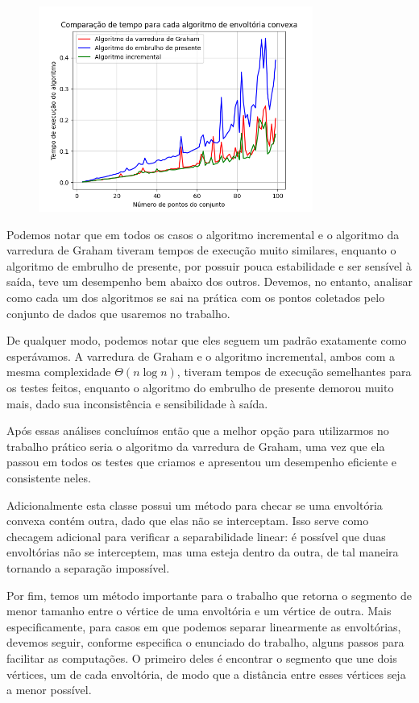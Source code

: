 \documentclass{article}
\begin{document}
\begin{figure} [H]
	\includegraphics[width=9cm]{normal.png}
	\centering
\end{figure}

Podemos notar que em todos os casos o algoritmo incremental e o algoritmo da varredura de Graham tiveram tempos de execução muito similares, enquanto o algoritmo de embrulho de presente, por possuir pouca estabilidade e ser sensível à saída, teve um desempenho bem abaixo dos outros. Devemos, no entanto, analisar como cada um dos algoritmos se sai na prática com os pontos coletados pelo conjunto de dados que usaremos no trabalho.

De qualquer modo, podemos notar que eles seguem um padrão exatamente como esperávamos. A varredura de Graham e o algoritmo incremental, ambos com a mesma complexidade \( \Theta(n \log n) \), tiveram tempos de execução semelhantes para os testes feitos, enquanto o algoritmo do embrulho de presente demorou muito mais, dado sua inconsistência e sensibilidade à saída.

Após essas análises concluímos então que a melhor opção para utilizarmos no trabalho prático seria o algoritmo da varredura de Graham, uma vez que ela passou em todos os testes que criamos e apresentou um desempenho eficiente e consistente neles.

Adicionalmente esta classe possui um método para checar se uma envoltória convexa contém outra, dado que elas não se interceptam. Isso serve como checagem adicional para verificar a separabilidade linear: é possível que duas envoltórias não se interceptem, mas uma esteja dentro da outra, de tal maneira tornando a separação impossível.

Por fim, temos um método importante para o trabalho que retorna o segmento de menor tamanho entre o vértice de uma envoltória e um vértice de outra. Mais especificamente, para casos em que podemos separar linearmente as envoltórias, devemos seguir, conforme especifica o enunciado do trabalho, alguns passos para facilitar as computações. O primeiro deles é encontrar o segmento que une dois vértices, um de cada envoltória, de modo que a distância entre esses vértices seja a menor possível.
\end{document}
